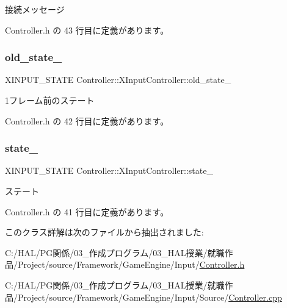 接続メッセージ 



 Controller.\+h の 43 行目に定義があります。

\mbox{\label{class_controller_1_1_x_input_controller_a8b9cc519f51442d11b0eecf06afaf702}} 
\subsubsection{\texorpdfstring{old\+\_\+state\+\_\+}{old\_state\_}}
{\footnotesize\ttfamily X\+I\+N\+P\+U\+T\+\_\+\+S\+T\+A\+TE Controller\+::\+X\+Input\+Controller\+::old\+\_\+state\+\_\+\hspace{0.3cm}{\ttfamily [private]}}



1フレーム前のステート 



 Controller.\+h の 42 行目に定義があります。

\mbox{\label{class_controller_1_1_x_input_controller_a3ab82fee9794108189ed9851eca78cd9}} 
\subsubsection{\texorpdfstring{state\+\_\+}{state\_}}
{\footnotesize\ttfamily X\+I\+N\+P\+U\+T\+\_\+\+S\+T\+A\+TE Controller\+::\+X\+Input\+Controller\+::state\+\_\+\hspace{0.3cm}{\ttfamily [private]}}



ステート 



 Controller.\+h の 41 行目に定義があります。



このクラス詳解は次のファイルから抽出されました\+:\begin{DoxyCompactItemize}
\item 
C\+:/\+H\+A\+L/\+P\+G関係/03\+\_\+作成プログラム/03\+\_\+\+H\+A\+L授業/就職作品/\+Project/source/\+Framework/\+Game\+Engine/\+Input/\mbox{\hyperlink{_controller_8h}{Controller.\+h}}\item 
C\+:/\+H\+A\+L/\+P\+G関係/03\+\_\+作成プログラム/03\+\_\+\+H\+A\+L授業/就職作品/\+Project/source/\+Framework/\+Game\+Engine/\+Input/\+Source/\mbox{\hyperlink{_controller_8cpp}{Controller.\+cpp}}\end{DoxyCompactItemize}
